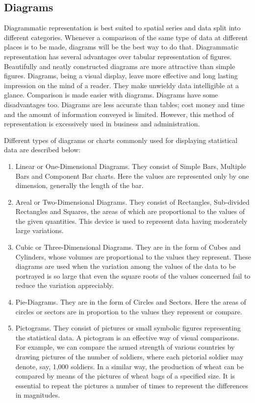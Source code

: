 \documentclass[]{article}
\begin{document}
\hypertarget{diagrams}{%
\subsection{Diagrams}\label{diagrams}}

Diagrammatic representation is best suited to spatial series and data
split into different categories. Whenever a comparison of the same type
of data at different places is to be made, diagrams will be the best way
to do that. Diagrammatic representation has several advantages over
tabular representation of figures. Beautifully and neatly constructed
diagrams are more attractive than simple figures. Diagrams, being a
visual display, leave more effective and long lasting impression on the
mind of a reader. They make unwieldy data intelligible at a glance.
Comparison is made easier with diagrams. Diagrams have some
disadvantages too. Diagrams are less accurate than tables; cost money
and time and the amount of information conveyed is limited. However,
this method of representation is excessively used in business and
administration.

Different types of diagrams or charts commonly used for displaying
statistical data are described below:

\begin{enumerate}
\def\labelenumi{(\roman{enumi})}
\item
  Linear or One-Dimensional Diagrams. They consist of Simple Bars,
  Multiple Bars and Component Bar charts. Here the values are
  represented only by one dimension, generally the length of the bar.
\item
  Areal or Two-Dimensional Diagrams. They consist of Rectangles,
  Sub-divided Rectangles and Squares, the areas of which are
  proportional to the values of the given quantities. This device is
  used to represent data having moderately large variations.
\item
  Cubic or Three-Dimensional Diagrams. They are in the form of Cubes and
  Cylinders, whose volumes are proportional to the values they
  represent. These diagrams are used when the variation among the values
  of the data to be portrayed is so large that even the square roots of
  the values concerned fail to reduce the variation appreciably.
\item
  Pie-Diagrams. They are in the form of Circles and Sectors. Here the
  areas of circles or sectors are in proportion to the values they
  represent or compare.
\item
  Pictograms. They consist of pictures or small symbolic figures
  representing the statistical data. A pictogram is an effective way of
  visual comparisons. For example, we can compare the armed strength of
  various countries by drawing pictures of the number of soldiers, where
  each pictorial soldier may denote, say, 1,000 soldiers. In a similar
  way, the production of wheat can be compared by means of the pictures
  of wheat bags of a specified size. It is essential to repeat the
  pictures a number of times to represent the differences in magnitudes.
\end{enumerate}
\end{document}
